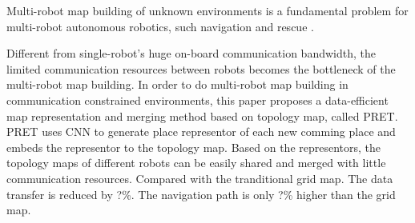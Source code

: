 \label{sec:intro}

Multi-robot map building of unknown environments is a fundamental problem for multi-robot autonomous robotics, such navigation  \cite{tanner2005towards} and rescue \cite{baxter2007multi}.

Different from single-robot's huge on-board communication bandwidth, the limited communication resources between robots becomes the bottleneck of the multi-robot map building.
In order to do multi-robot map building in communication constrained environments, this paper proposes a data-efficient map representation and merging method based on topology map, called PRET.
PRET uses CNN to generate place representor of each new comming place and embeds the representor to the topology map.
Based on the representors, the topology maps of different robots can be easily shared and merged with little communication resources.
Compared with the tranditional grid map. The data transfer is reduced by ?\%. The navigation path is only ?\% higher than the grid map. %
